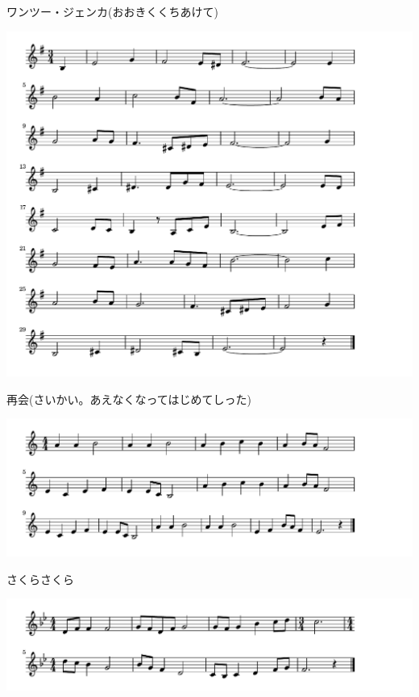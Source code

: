 \documentclass[a4paper]{ltjsarticle}
\begin{document}
\vspace{-10mm} \hspace{10mm}
ワンツー・ジェンカ(おおきくくちあけて)


\includegraphics[clip]{saikai_crop.pdf}

\vspace{-10mm} \hspace{10mm}
再会(さいかい。あえなくなってはじめてしった)



\includegraphics[clip]{sakura_crop.pdf}

\vspace{-10mm} \hspace{10mm}
さくらさくら



\includegraphics[clip]{shuchou_crop.pdf}
\end{document}
